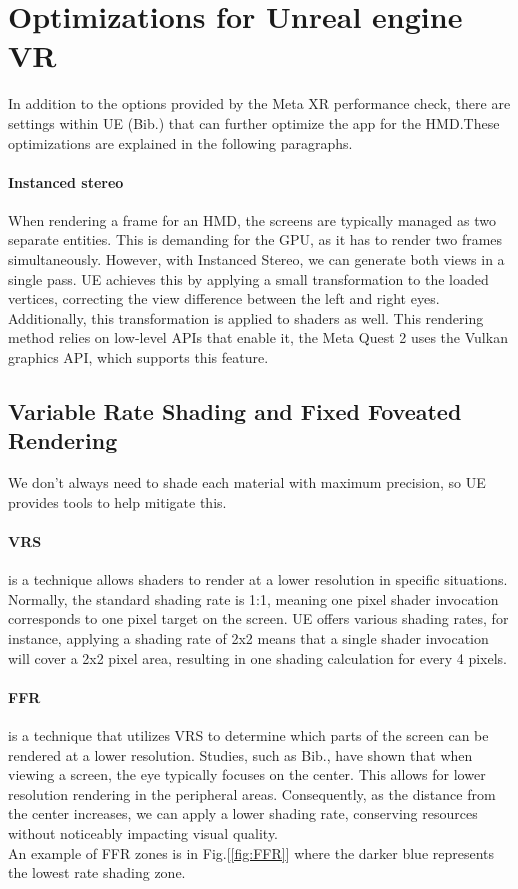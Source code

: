 \section{Optimizations for Unreal engine VR}
\noindent
In addition to the options provided by the Meta XR performance check, there are settings within \ac{UE} (Bib.\cite{UEperformance}) that can further optimize the app for the \ac{HMD}.These optimizations are explained in the following paragraphs.

\paragraph{Instanced stereo}
When rendering a frame for an \ac{HMD}, the screens are typically managed as two separate entities. This is demanding for the GPU, as it has to render two frames simultaneously.
However, with Instanced Stereo, we can generate both views in a single pass. \ac{UE} achieves this by applying a small transformation to the loaded vertices, correcting the view difference between the left and right eyes. Additionally, this transformation is applied to shaders as well.
This rendering method relies on low-level \ac{API}s that enable it, the Meta Quest 2 uses the Vulkan graphics \ac{API}, which supports this feature.

\subsection{Variable Rate Shading and Fixed Foveated Rendering}
\noindent
We don't always need to shade each material with maximum precision, so \ac{UE} provides tools to help mitigate this.

\paragraph{\ac{VRS}}
is a technique allows shaders to render at a lower resolution in specific situations.
Normally, the standard shading rate is 1:1, meaning one pixel shader invocation corresponds to one pixel target on the screen.
\ac{UE} offers various shading rates, for instance, applying a shading rate of 2x2 means that a single shader invocation will cover a 2x2 pixel area, resulting in one shading calculation for every 4 pixels.

\paragraph{\ac{FFR}}
is a technique that utilizes \ac{VRS} to determine which parts of the screen can be rendered at a lower resolution.
Studies, such as Bib.\cite{eye}, have shown that when viewing a screen, the eye typically focuses on the center.
This allows for lower resolution rendering in the peripheral areas. Consequently, as the distance from the center increases, we can apply a lower shading rate, conserving resources without noticeably impacting visual quality.\\
An example of \ac{FFR} zones is in Fig.[\ref{fig:FFR}] where the darker blue represents the lowest rate shading zone.


